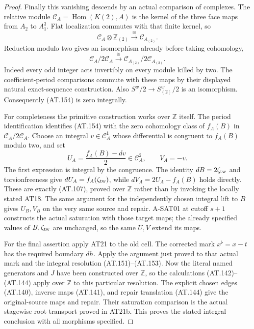 \begin{proof}
Finally this vanishing descends by an actual comparison
of complexes. The relative module
$\mathcal C_A=\operatorname{Hom}(K(2),A)$ is the kernel
of the three face maps from $A_2$ to $A_1^3$.
Flat localization commutes with that finite kernel, so
\[
 \mathcal C_A\otimes\mathbb Z_{(2)}
           \xrightarrow{\;\cong\;}\mathcal C_{A_{(2)}}.
\]
Reduction modulo two gives an isomorphism already
before taking cohomology,
\[
               \mathcal C_A/2\mathcal C_A
                 \xrightarrow{\;\cong\;}
               \mathcal C_{A_{(2)}}/2\mathcal C_{A_{(2)}} .
 \tag{AT.156}
\]
Indeed every odd integer acts invertibly on every
module killed by two. The coefficient-period
comparisons commute with these maps by their
displayed natural exact-sequence construction.
Also $S^w/2\to S_{(2)}^w/2$ is an isomorphism.
Consequently (AT.154) is zero integrally.

For completeness the primitive construction works
over $\mathbb Z$ itself. The period identification
identifies (AT.154) with the zero cohomology class
of $f_A(B)$ in $\mathcal C_A/2\mathcal C_A$.
Choose an integral $v\in\mathcal C_A^1$ whose
differential is congruent to $f_A(B)$ modulo two, and set
\[
        U_A=\frac{f_A(B)-dv}{2}\in\mathcal C_A^2,
        \qquad V_A=-v .
\]
The first expression is integral by the congruence.
The identity $dB=2\zeta_{\rm tw}$ and torsionfreeness
give $dU_A=f_A(\zeta_{\rm tw})$, while
$dV_A=2U_A-f_A(B)$ holds directly.
These are exactly (AT.107), proved over $\mathbb Z$
rather than by invoking the locally stated AT18.
The same argument for the independently chosen
integral lift to $B$ gives $U_B,V_B$ on the very
same source and repair. A-SAT01 at cutoff $s+1$
constructs the actual saturation with those target
maps; the already specified values of $B,\zeta_{\rm tw}$
are unchanged, so the same $U,V$ extend its maps.

For the final assertion apply AT21 to the old cell.
The corrected mark $x^\flat=x-t$ has the required
boundary $dh$. Apply the argument just proved to
that actual mark and the integral resolution (AT.151)--(AT.153).
Now the literal named generators and $J$ have been
constructed over $\mathbb Z$, so the calculations
(AT.142)--(AT.144) apply over $\mathbb Z$ to this
particular resolution. The explicit chosen edges
(AT.140), inverse maps (AT.141), and repair translation
(AT.144) give the original-source maps and repair.
Their saturation comparison is the actual
stagewise root transport proved in AT21b.
This proves the stated integral conclusion with all
morphisms specified.
\end{proof}
